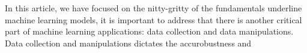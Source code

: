 In this article, we have focused on the nitty-gritty of the fundamentals underline machine learning models, it is important to address that there is another critical part of machine learning applications: data collection and data manipulations. Data collection and manipulations dictates the accurobustness and 